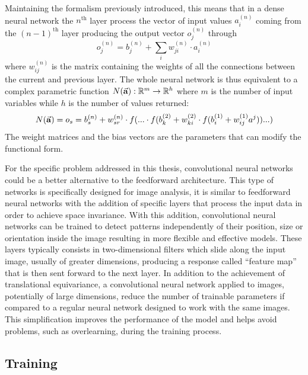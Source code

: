\documentclass[a4paper,10pt]{report}
\begin{document}
Maintaining the formalism previously introduced, this means that in a dense 
neural network the $n^{\text{th}}$ layer process the vector of input values 
$a_i^{(n)}$ coming from the $(n-1)^{\text{th}}$ layer producing the output vector $o_j^{(n)}$ through
\begin{equation}
    o_j^{(n)} = b_j^{(n)} + \sum_i w^{(n)}_{ji}\cdot a^{(n)}_i
\end{equation}
where $w^{(n)}_{ij}$ is the matrix containing the weights of all the connections between the current and previous layer.
The whole neural network is thus equivalent to a complex parametric function $N (\va a): \mathbb{R}^m \rightarrow \mathbb{R}^h$ where $m$ is 
the number of input variables while $h$ is the number of values returned:
\begin{equation}
    N(\va a) = o_s = b_s^{(n)} + w^{(n)}_{sr} 
    \cdot f( ... \cdot f( b_k^{(2)} + w_{ki}^{(2)} \cdot f(b_i^{(1)} + w_{ij}^{(1)}a^j)) ... )
\end{equation}
The weight matrices and the bias vectors are the parameters that can modify the functional form.

For the specific problem addressed in this thesis, convolutional neural networks could be a better alternative 
to the feedforward architecture.
This type of networks is specifically designed for image analysis, 
it is similar to feedforward neural networks with the addition
of specific layers that process the input data in order to achieve 
space invariance. With this addition, convolutional neural networks can be trained
to detect patterns independently of their position, size or orientation inside the image
resulting in more flexible and effective models.
These layers typically consists in two-dimensional filters which slide along the input image, usually of greater dimensions, 
producing a response called ``feature map'' that is then sent forward to the next layer.
In addition to the achievement of translational equivariance, a convolutional neural network
applied to images, potentially of large dimensions, reduce the number of trainable parameters
if compared to a regular neural network designed to work with the same images. This simplification improves the
performance of the model and helps avoid problems, such as overlearning, during the training process.

\subsection{Training}
\end{document}
